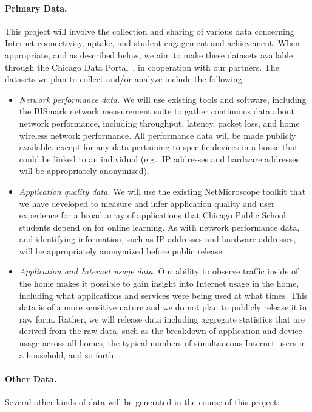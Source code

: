 \paragraph{Primary Data.} This project will involve the collection and sharing
of various data concerning Internet connectivity, uptake, and student
engagement and achievement. When appropriate, and as described below, we aim
to make these datasets available through the Chicago Data
Portal~\cite{www-chicago-data}, in cooperation with our partners.  The
datasets we plan to collect and/or analyze include the
following:
\begin{itemize}
    \itemsep=-1pt
    \item {\em Network performance data.} We will use existing tools and
        software, including the BISmark network measurement suite to gather
        continuous data about network performance, including throughput,
        latency, packet loss, and home wireless network performance.  All
        performance data will be made publicly available, except for any data
        pertaining to specific devices in a house that could be linked to an
        individual (e.g., IP addresses and hardware addresses will be
        appropriately anonymized).
    \item {\em Application quality data.} We will use the existing
        NetMicroscope toolkit that we have developed to measure and infer
        application quality and user experience for a broad array of
        applications that Chicago Public School students depend on for online
        learning. As with network performance data, and identifying
        information, such as IP addresses and hardware addresses, will be
        appropriately anonymized before public release.
    \item {\em Application and Internet usage data.} Our ability to observe
        traffic inside of the home makes it possible to gain insight into
        Internet usage in the home, including what applications and services
        were being used at what times. This data is of a more sensitive nature
        and we do not plan to publicly release it in raw form. Rather, we will
        release data including aggregate statistics that are derived from the
        raw data, such as the breakdown of application and device usage across
        all homes, the typical numbers of simultaneous Internet users in a
        household, and so forth.
\end{itemize}

\paragraph{Other Data.} Several other kinds of data will be generated in the
course of this project:

